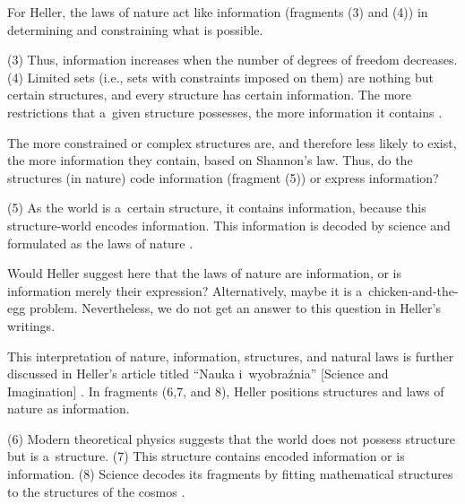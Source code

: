 For Heller, the laws of nature act like information (fragments (3) and (4)) in determining and constraining what is possible.



(3) Thus, information increases when the number of degrees of freedom decreases. (4) Limited sets (i.e., sets with constraints imposed on them) are nothing but certain structures, and every structure has certain information. The more restrictions that a~given structure possesses, the more information it contains 
\parencite[][pp.62–63]{heller_filozofia_2009}.%




The more constrained or complex structures are, and therefore less likely to exist, the more information they contain, based on Shannon's law. Thus, do the structures (in nature) code information (fragment (5)) or express information?



(5) As the world is a~certain structure, it contains information, because this structure-world encodes information. This information is decoded by science and formulated as the laws of nature 
\parencite[][pp.62–63]{heller_filozofia_2009}.%




Would Heller suggest here that the laws of nature are information, or is information merely their expression? Alternatively, maybe it is a~chicken-and-the-egg problem. Nevertheless, we do not get an answer to this question in Heller's writings.



This interpretation of nature, information, structures, and natural laws is further discussed in Heller's article titled ``Nauka i~wyobraźnia'' [Science and Imagination] 
\parencite[][]{heller_nauka_1995}. %
 In fragments (6,7, and 8), Heller positions structures and laws of nature as information.



(6) Modern theoretical physics suggests that the world does not possess structure but is a~structure. (7) This structure contains encoded information or is information. (8) Science decodes its fragments by fitting mathematical structures to the structures of the cosmos 
\parencite[][p.170]{heller_nauka_1995}.%




